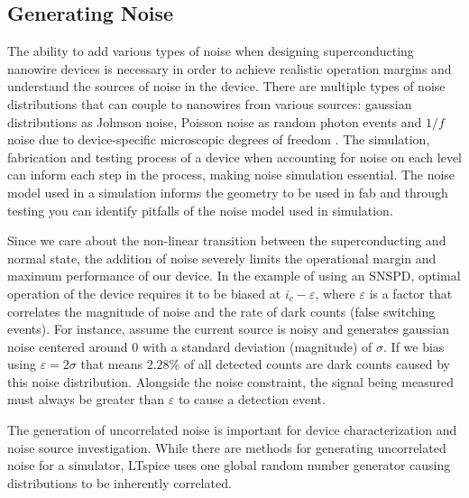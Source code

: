 

\subsection{Generating Noise} \label{gen_noise}


The ability to add various types of noise when designing superconducting nanowire devices is necessary in order to achieve realistic operation margins and understand the sources of noise in the device. There are multiple types of noise distributions that can couple to nanowires from various sources: gaussian distributions as Johnson noise, Poisson noise
as random photon events and $1/f$ noise due to device-specific microscopic degrees of freedom \cite{1overfinsc}. The simulation, fabrication and testing process of a device
when accounting for noise on each level can inform each step in the process, making noise
simulation essential. The noise model used in a simulation informs the geometry to be 
used in fab and through testing you can identify pitfalls of the noise model used
in simulation.


Since we care about the non-linear transition between
the superconducting and normal state, the addition of noise severely limits the operational margin and
maximum performance of our device. In the example of using an SNSPD, optimal operation of the device 
requires it to be biased at $i_c-\varepsilon$, where $\varepsilon$ is a factor that correlates the 
magnitude of noise and the rate of dark counts (false switching events). For instance, assume the current source is noisy and generates
gaussian noise centered around $0$ with a standard deviation (magnitude) of $\sigma$.
If we bias using $\varepsilon = 2\sigma$ that means $2.28\%$ of all detected counts are dark counts caused by this noise distribution.
Alongside the noise constraint, the signal being measured 
must always be greater than $\varepsilon$ to cause a detection event.

The generation of uncorrelated noise is important for device characterization and
noise source investigation.
While there are methods for generating uncorrelated noise for a simulator, 
LTspice uses one global random number generator causing distributions to be 
inherently correlated.

